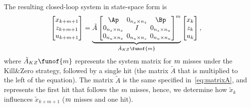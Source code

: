 The resulting closed-loop system in state-space form is
%
\begin{equation} 
    \setlength\arraycolsep{2pt}
    \label{eq:KZ}
    \begin{bmatrix}
        x_{k+\nummisses+1} \\
        z_{k+\nummisses+1} \\
        u_{k+\nummisses+1}
    \end{bmatrix} = 
    \underbrace{ \tilde A \begin{bmatrix}
        \Ap                                         & 0_{n_x \times n_z}  & \Bp \\
        0_{n_z \times n_x}    & I                                         & 0_{n_z \times n_u} \\
        0_{n_u \times n_x}   & 0_{n_u \times n_z}   & 0_{n_u \times n_u}
    \end{bmatrix}^{\nummisses}}_{\tilde A_{KZ}\funof{\nummisses}}
    \begin{bmatrix}
        x_{k} \\
        z_{k} \\
        u_{k}
    \end{bmatrix},
\end{equation}
%
where $\tilde A_{KZ}\funof{\nummisses}$ represents the system matrix for $m$ misses under the Kill\&Zero strategy, followed by a single hit (the matrix $\tilde A$ that is multiplied to the left of the equation).
The matrix $\tilde A$ is the same specified in~\eqref{eq:matrixA}, and represents the first hit that follows the $m$ misses, hence, we determine how $\tilde{x}_k$ influences $\tilde{x}_{k+m+1}$ ($m$ misses and one hit).

